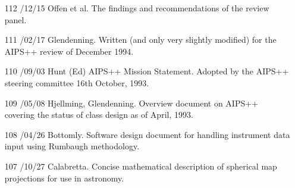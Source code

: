 %
\begin{enumerate}

\item[112] 
/12/15 Offen et al.
\linebreak  The findings and recommendations of the review panel.

\item[111] 
/02/17 Glendenning.
\linebreak  Written (and only very slightly modified) for the AIPS++ review of
   December 1994.

\item[110] 
/09/03 Hunt (Ed)
\linebreak  AIPS++ Mission Statement.  Adopted by the AIPS++ steering committee
   16th October, 1993.

\item[109] 
/05/08 Hjellming, Glendenning.
\linebreak  Overview document on AIPS++ covering the status of class design as of
   April, 1993.

\item[108] 
/04/26 Bottomly.
\linebreak  Software design document for handling instrument data input using
   Rumbaugh methodology.

\item[107] 
/10/27 Calabretta.
\linebreak  Concise mathematical description of spherical map projections for use in
   astronomy.


\end{enumerate}
